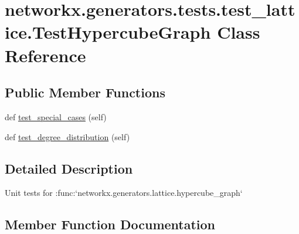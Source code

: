 \hypertarget{classnetworkx_1_1generators_1_1tests_1_1test__lattice_1_1TestHypercubeGraph}{}\section{networkx.\+generators.\+tests.\+test\+\_\+lattice.\+Test\+Hypercube\+Graph Class Reference}
\label{classnetworkx_1_1generators_1_1tests_1_1test__lattice_1_1TestHypercubeGraph}
\subsection*{Public Member Functions}
\begin{DoxyCompactItemize}
\item 
def \hyperlink{classnetworkx_1_1generators_1_1tests_1_1test__lattice_1_1TestHypercubeGraph_ae99e9079ba0fc5f7a9d1c8e7bdfc20ca}{test\+\_\+special\+\_\+cases} (self)
\item 
def \hyperlink{classnetworkx_1_1generators_1_1tests_1_1test__lattice_1_1TestHypercubeGraph_a46f493632005f562f8dff28f9a80c631}{test\+\_\+degree\+\_\+distribution} (self)
\end{DoxyCompactItemize}


\subsection{Detailed Description}
\begin{DoxyVerb}Unit tests for :func:`networkx.generators.lattice.hypercube_graph`\end{DoxyVerb}
 

\subsection{Member Function Documentation}
\mbox{\label{classnetworkx_1_1generators_1_1tests_1_1test__lattice_1_1TestHypercubeGraph_a46f493632005f562f8dff28f9a80c631}} 
